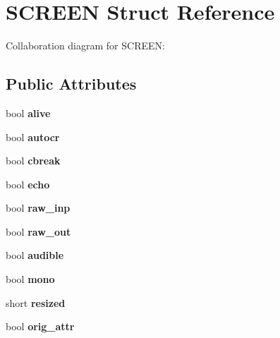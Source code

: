 \hypertarget{structSCREEN}{}\section{S\+C\+R\+E\+EN Struct Reference}
\label{structSCREEN}


Collaboration diagram for S\+C\+R\+E\+EN\+:
\subsection*{Public Attributes}
\begin{DoxyCompactItemize}
\item 
\mbox{\label{structSCREEN_aacd0ae7c4cbe17434407506835c92b87}} 
bool {\bfseries alive}
\item 
\mbox{\label{structSCREEN_ae09129a55fdd4ad25c81bab258fbca87}} 
bool {\bfseries autocr}
\item 
\mbox{\label{structSCREEN_aea51066f1005e1dc7b85c02f33a3bc08}} 
bool {\bfseries cbreak}
\item 
\mbox{\label{structSCREEN_aa414f3bb31f95a0684083a5f422da6a0}} 
bool {\bfseries echo}
\item 
\mbox{\label{structSCREEN_ae88e4d3b9e639f262da2377ee9da2c0d}} 
bool {\bfseries raw\+\_\+inp}
\item 
\mbox{\label{structSCREEN_a4b372f4dcb1604e943c385e1da100962}} 
bool {\bfseries raw\+\_\+out}
\item 
\mbox{\label{structSCREEN_a2e8d17f11d69abf1df13b73194e7bbb4}} 
bool {\bfseries audible}
\item 
\mbox{\label{structSCREEN_aa720ffce100d26579aed0caff5086912}} 
bool {\bfseries mono}
\item 
\mbox{\label{structSCREEN_af1596d2d5fedfb73db6ac5e2eafb2e1e}} 
short {\bfseries resized}
\item 
\mbox{\label{structSCREEN_a2588497a6af2de35063691679a080e96}} 
bool {\bfseries orig\+\_\+attr}

\end{DoxyCompactItemize}
